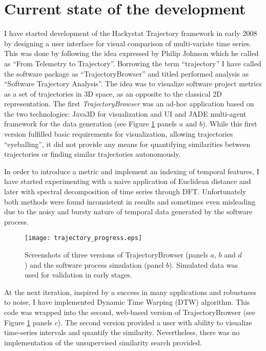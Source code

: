 \section{Current state of the development}
I have started development of the Hackystat Trajectory framework in early 2008 by designing a user interface for visual comparison of multi-variate time series. This was done by following the idea expressed by Philip Johnson which he called as ``From Telemetry to Trajectory''. Borrowing the term ``trajectory'' I have called the software package as ``TrajectoryBrowser'' and titled performed analysis as ``Software Trajectory Analysis''. The idea was to visualize software project metrics as a set of trajectories in 3D space, as an opposite to the classical 2D representation. The first \textit{TrajectoryBrowser} was an ad-hoc application based on the two technologies: Java3D for visualization and UI and JADE multi-agent framework \cite{citeulike:1230319} for the data generation (see Figure \ref{fig:trajectory_progress} panels $a$ and $b$). While this first version fulfilled basic requirements for visualization, allowing trajectories ``eyeballing'', it did not provide any means for quantifying similarities between trajectories or finding similar trajectories autonomously.

In order to introduce a metric and implement an indexing of temporal features, I have started experimenting with a naive application of Euclidean distance and later with spectral decomposition of time series through DFT. Unfortunately both methods were found inconsistent in results and sometimes even misleading due to the noisy and bursty nature of temporal data generated by the software process. 

\begin{figure}[tbp]
   \centering
   \texttt{[image: trajectory\_progress.eps]}
   \caption{Screenshots of three versions of TrajectoryBrowser (panels $a$, $b$ and $d$) and the software process simulation (panel $b$). Simulated data was used for validation in early stages.}
   \label{fig:trajectory_progress}
\end{figure}

At the next iteration, inspired by a success in many applications and robustness to noise, I have implemented Dynamic Time Warping (DTW) algorithm. This code was wrapped into the second, web-based version of TrajectoryBrowser (see Figure \ref{fig:trajectory_progress} panels $c$). The second version provided a user with ability to visualize time-series intervals and quantify the similarity. Nevertheless, there was no implementation of the unsupervised similarity search provided.

